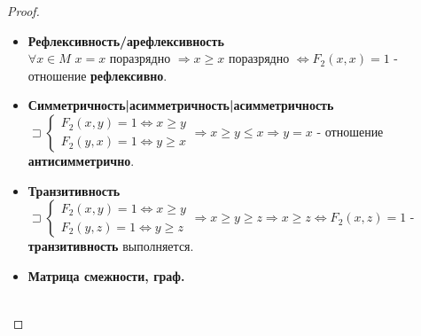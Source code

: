 \begin{proof} $ $
	\begin{itemize}
  	\item \textbf{Рефлексивность/арефлексивность \\}
  	\( \forall x \in M \) \( x = x \) поразрядно \( \Rightarrow x \geqslant x \) поразрядно \( \Leftrightarrow F_2(x, x) = 1 \) - отношение \textbf{рефлексивно}.
  	\item \textbf{Симметричность|асимметричность|асимметричность \\}
  	\( \sqsupset
  	\begin{cases}
    F_2(x,y) = 1 \Leftrightarrow x \geqslant y \\
    F_2(y,x) = 1 \Leftrightarrow y \geqslant x 
  	\end{cases} \Rightarrow x \geqslant y \leqslant x \Rightarrow y = x\) - отношение \textbf{антисимметрично}.
  	\item \textbf{Транзитивность \\}
  	\( \sqsupset
  	\begin{cases}
    F_2(x,y) = 1 \Leftrightarrow x \geqslant y \\
    F_2(y,z) = 1 \Leftrightarrow y \geqslant z
  	\end{cases} \Rightarrow x \geqslant y \geqslant z \Rightarrow x \geqslant z \Leftrightarrow F_2(x, z) = 1 \) - \textbf{транзитивность} выполняется.
  	\item \textbf{Матрица смежности, граф. \\}
  	 \\


\end{itemize}
\end{proof}
